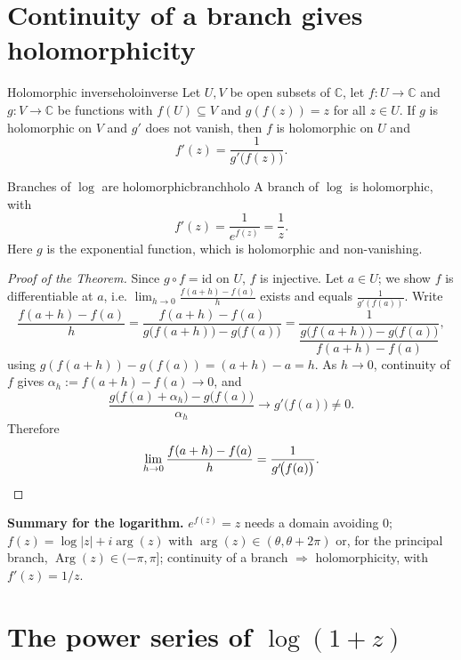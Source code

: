 \documentclass[11pt,openany]{report}
\newcommand{\C}{\mathbb{C}}
\newcommand{\Arg}{\operatorname{Arg}}
\newcommand{\abs}[1]{\left\lvert #1 \right\rvert}
\newcommand{\To}{\longrightarrow}
\begin{document}
\section{Continuity of a branch gives holomorphicity}

\begin{theorem}{Holomorphic inverse}{holoinverse}
Let $U,V$ be open subsets of $\C$, let $f:U\to\C$ and $g:V\to\C$ be functions with
$f(U)\subseteq V$ and $g(f(z))=z$ for all $z\in U$. If $g$ is holomorphic on $V$ and $g'$
does not vanish, then $f$ is holomorphic on $U$ and
\[
  f'(z) = \frac{1}{g'\!\bigl(f(z)\bigr)}.
\]
\end{theorem}

\begin{corollary}{Branches of $\log$ are holomorphic}{branchholo}
A branch of $\log$ is holomorphic, with
\[
  \boxed{\ f'(z) = \frac{1}{e^{f(z)}} = \frac1z.\ }
\]
Here $g$ is the exponential function, which is holomorphic and non-vanishing.
\end{corollary}

\begin{proof}[Proof of the Theorem]
Since $g\circ f=\mathrm{id}$ on $U$, $f$ is injective. Let $a\in U$; we show $f$ is
differentiable at $a$, i.e. $\lim_{h\to0}\frac{f(a+h)-f(a)}{h}$ exists and equals
$\frac{1}{g'(f(a))}$. Write
\[
  \frac{f(a+h)-f(a)}{h}
  = \frac{f(a+h)-f(a)}{g\bigl(f(a+h)\bigr)-g\bigl(f(a)\bigr)}
  = \frac{1}{\dfrac{g\bigl(f(a+h)\bigr)-g\bigl(f(a)\bigr)}{f(a+h)-f(a)}},
\]
using $g(f(a+h))-g(f(a)) = (a+h)-a = h$. As $h\to0$, continuity of $f$ gives
$\alpha_h := f(a+h)-f(a)\to0$, and
\[
  \frac{g\bigl(f(a)+\alpha_h\bigr)-g\bigl(f(a)\bigr)}{\alpha_h} \To g'\!\bigl(f(a)\bigr)\ne0.
\]
Therefore
\[
  \lim_{h\to0}\frac{f(a+h)-f(a)}{h} = \frac{1}{g'\!\bigl(f(a)\bigr)}. \qedhere
\]
\end{proof}

\begin{remark}
\textbf{Summary for the logarithm.} $e^{f(z)}=z$ needs a domain avoiding $0$;
$f(z)=\log\abs{z}+i\arg(z)$ with $\arg(z)\in(\theta,\theta+2\pi)$ or, for the principal
branch, $\Arg(z)\in(-\pi,\pi]$; continuity of a branch $\Rightarrow$ holomorphicity, with
$f'(z)=1/z$.
\end{remark}

\section{The power series of \texorpdfstring{$\log(1+z)$}{log(1+z)}}
\end{document}
